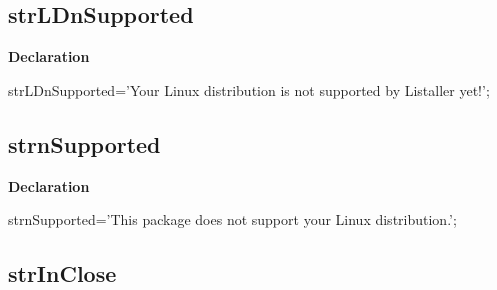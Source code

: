 \documentclass{report}
\newif\ifpdf
\begin{document}
\subsection*{strLDnSupported}
\fi
\label{trstrings-strLDnSupported}
\begin{list}{}{
\setlength{\itemindent}{0cm}
\setlength{\listparindent}{0cm}
\setlength{\leftmargin}{\evensidemargin}
\addtolength{\leftmargin}{\tmplength}
\settowidth{\labelsep}{X}
\addtolength{\leftmargin}{\labelsep}
\setlength{\labelwidth}{\tmplength}
}
\item[\textbf{Declaration}\hfill]
\ifpdf
\begin{flushleft}
\fi
\begin{ttfamily}
strLDnSupported='Your Linux distribution is not supported by Listaller yet!';\end{ttfamily}

\ifpdf
\end{flushleft}
\fi

\end{list}
\ifpdf
\subsection*{\large{\textbf{strnSupported}}\normalsize\hspace{1ex}\hrulefill}
\else
\subsection*{strnSupported}
\fi
\label{trstrings-strnSupported}
\begin{list}{}{
\setlength{\itemindent}{0cm}
\setlength{\listparindent}{0cm}
\setlength{\leftmargin}{\evensidemargin}
\addtolength{\leftmargin}{\tmplength}
\settowidth{\labelsep}{X}
\addtolength{\leftmargin}{\labelsep}
\setlength{\labelwidth}{\tmplength}
}
\item[\textbf{Declaration}\hfill]
\ifpdf
\begin{flushleft}
\fi
\begin{ttfamily}
strnSupported='This package does not support your Linux distribution.';\end{ttfamily}

\ifpdf
\end{flushleft}
\fi

\end{list}
\ifpdf
\subsection*{\large{\textbf{strInClose}}\normalsize\hspace{1ex}\hrulefill}
\else
\end{document}
